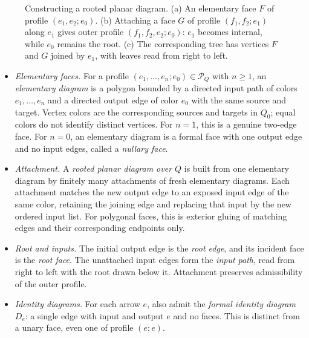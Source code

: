 \documentclass[11pt,letterpaper]{article}
\numberwithin{equation}{section}
\theoremstyle{plain}
\theoremstyle{definition}
\theoremstyle{remark}
\begin{document}
\begin{figure}[htbp]
\caption{Constructing a rooted planar diagram. (a) An elementary face
$F$ of profile $(e_1,e_2;e_0)$. (b) Attaching a face $G$ of profile
$(f_1,f_2;e_1)$ along $e_1$ gives outer profile $(f_1,f_2,e_2;e_0)$:
$e_1$ becomes internal, while $e_0$ remains the root. (c) The
corresponding tree has vertices $F$ and $G$ joined by $e_1$, with
leaves read from right to left.}
\label{fig:planar_diagram_attachment}
\end{figure}

\begin{itemize}
\item \emph{Elementary faces.}
For a profile $(e_1,\ldots,e_n;e_0)\in\mathcal P_Q$ with $n\geq1$, an
\textit{elementary diagram} is a polygon bounded by a directed input path
of colors $e_1,\ldots,e_n$ and a directed output edge of color $e_0$
with the same source and target. Vertex colors are the corresponding sources
and targets in $Q_0$; equal colors do not identify distinct vertices.
For $n=1$, this is a genuine two-edge face.
For $n=0$, an elementary diagram is a formal face with one output edge
and no input edges, called a \textit{nullary face}.

\item \emph{Attachment.}
A \textit{rooted planar diagram over $Q$} is built from one elementary
diagram by finitely many attachments of fresh elementary diagrams.
Each attachment matches the new output edge to an exposed input edge
of the same color, retaining the joining edge and replacing that input
by the new ordered input list. For polygonal faces, this is exterior
gluing of matching edges and their corresponding endpoints only.

\item \emph{Root and inputs.}
The initial output edge is the \textit{root edge}, and its incident face
is the \textit{root face}. The unattached input edges form the
\textit{input path}, read from right to left with the root drawn below it.
Attachment preserves admissibility of the outer profile.

\item \emph{Identity diagrams.}
For each arrow $e$, also admit the \textit{formal identity diagram}
$D_e$: a single edge with input and output $e$ and no faces. This is
distinct from a unary face, even one of profile $(e;e)$.
\end{itemize}
\end{document}
